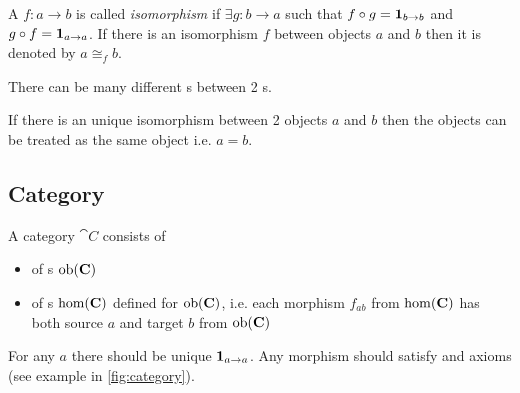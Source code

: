 \begin{definition}[Isomorphism]
\label{def:isomorphism} 
A  $f: a \to b$ is called \textit{isomorphism} if
$\exists g: b \to a$ such that $f \circ g = \mathbf{1}_{ b \to b }$ 
and $g \circ f = \mathbf{1}_{ a \to a }$.  
If there is an isomorphism $f$ between objects $a$ and $b$
then it is denoted by $a \cong_f b$. 
\end{definition}

\begin{remark}[Isomorphism]
\label{rem:isomorphism}
There can be many different s between 2
s. 

If there is an unique isomorphism between 2 objects $a$ and $b$ then the objects
can be treated as the same object i.e. $a = b$.
\end{remark}

\subsection{Category}

\begin{definition}[Category]
  \label{def:category}
  A category $\cat{C}$ consists of 
  \begin{itemize}
  \item {} of
    s $\mathrm{ob}(\mathbf{C})$
  \item {} of s $\mathrm{hom}(\mathbf{C})$
    defined for $\mathrm{ob}(\mathbf{C})$, i.e. each morphism $f_{ab}$ from 
    $\mathrm{hom}(\mathbf{C})$ has both source
    $a$ and target $b$ from $\mathrm{ob}(\mathbf{C})$
  \end{itemize}
  For any  $a$ there should be unique
   $\mathbf{1}_{ a \to a }$. Any morphism should satisfy
   and  axioms
  (see example in \cref{fig:category}).    
\end{definition}


